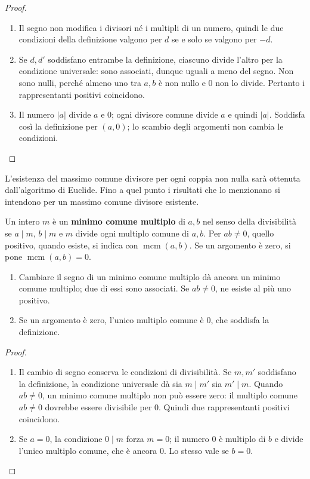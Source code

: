 \begin{proof}
\begin{enumerate}[label=\arabic*.]
\item Il segno non modifica i divisori né i multipli di un numero, quindi le due condizioni della definizione valgono per $d$ se e solo se valgono per $-d$.
\item Se $d,d'$ soddisfano entrambe la definizione, ciascuno divide l'altro per la condizione universale: sono associati, dunque uguali a meno del segno. Non sono nulli, perché almeno uno tra $a,b$ è non nullo e $0$ non lo divide. Pertanto i rappresentanti positivi coincidono.
\item Il numero $|a|$ divide $a$ e $0$; ogni divisore comune divide $a$ e quindi $|a|$. Soddisfa così la definizione per $(a,0)$; lo scambio degli argomenti non cambia le condizioni.
\end{enumerate}
\end{proof}

L'esistenza del massimo comune divisore per ogni coppia non nulla sarà ottenuta dall'algoritmo di Euclide. Fino a quel punto i risultati che lo menzionano si intendono per un massimo comune divisore esistente.

\begin{definizione}
Un intero $m$ è un \textbf{minimo comune multiplo} di $a,b$ nel senso della divisibilità se $a\mid m$, $b\mid m$ e $m$ divide ogni multiplo comune di $a,b$. Per $ab\ne0$, quello positivo, quando esiste, si indica con $\operatorname{mcm}(a,b)$. Se un argomento è zero, si pone $\operatorname{mcm}(a,b)=0$.
\end{definizione}

\begin{proposizione}
\begin{enumerate}[label=\arabic*.]
\item Cambiare il segno di un minimo comune multiplo dà ancora un minimo comune multiplo; due di essi sono associati. Se $ab\ne0$, ne esiste al più uno positivo.
\item Se un argomento è zero, l'unico multiplo comune è $0$, che soddisfa la definizione.
\end{enumerate}
\end{proposizione}
\begin{proof}
\begin{enumerate}[label=\arabic*.]
\item Il cambio di segno conserva le condizioni di divisibilità. Se $m,m'$ soddisfano la definizione, la condizione universale dà sia $m\mid m'$ sia $m'\mid m$. Quando $ab\ne0$, un minimo comune multiplo non può essere zero: il multiplo comune $ab\ne0$ dovrebbe essere divisibile per $0$. Quindi due rappresentanti positivi coincidono.
\item Se $a=0$, la condizione $0\mid m$ forza $m=0$; il numero $0$ è multiplo di $b$ e divide l'unico multiplo comune, che è ancora $0$. Lo stesso vale se $b=0$.
\end{enumerate}
\end{proof}


